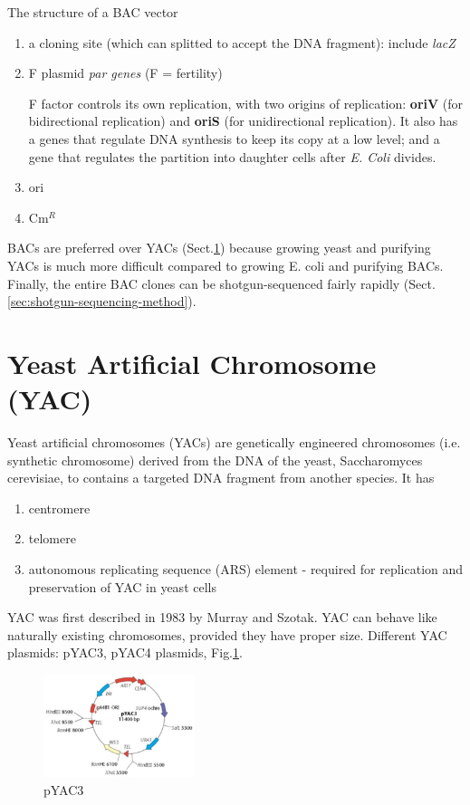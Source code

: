 The structure of a BAC vector
\begin{enumerate}
  \item  a cloning site (which can splitted to accept the DNA fragment): include
  {\it lacZ}
  
  \item F plasmid {\it par genes} (F = fertility)
  
  F factor controls its own replication, with two origins of replication: {\bf
  oriV} (for bidirectional replication) and {\bf oriS} (for unidirectional
  replication). It also has a genes that regulate DNA synthesis to keep its copy
  at a low level; and a gene that regulates the partition into daughter cells
  after {\it E. Coli} divides.
  
  \item ori
  
  \item Cm$^R$
\end{enumerate} 

BACs are preferred over YACs (Sect.\ref{sec:YAC}) because growing yeast and
purifying YACs is much more difficult compared to growing E. coli and purifying
BACs.  Finally, the entire BAC clones can be shotgun-sequenced fairly rapidly
(Sect.\ref{sec:shotgun-sequencing-method}).

\section{Yeast Artificial Chromosome (YAC)}
\label{sec:YAC}


Yeast artificial chromosomes (YACs) are genetically engineered chromosomes (i.e.
synthetic chromosome) derived from the DNA of the yeast, Saccharomyces
cerevisiae, to contains a targeted DNA fragment from another species. 
It has
\begin{enumerate}
  \item centromere
  \item telomere
  \item autonomous replicating sequence (ARS) element - required for
  replication and preservation of YAC in yeast cells
\end{enumerate}

YAC was first described in 1983 by Murray and Szotak.
YAC can behave like naturally existing chromosomes, provided they have proper
size. Different YAC plasmids: pYAC3, pYAC4 plasmids, Fig.\ref{fig:YAC-pYAC3}.

\begin{figure}[htb]
  \centerline{\includegraphics[height=3cm]{./images/YAC-pYAC3.eps}}
  \caption{pYAC3}\label{fig:YAC-pYAC3}
\end{figure}

